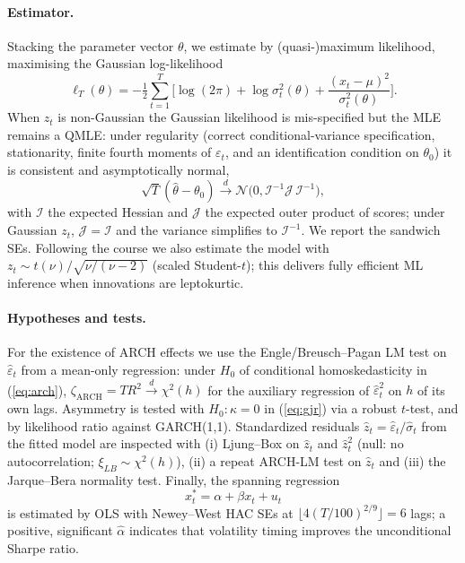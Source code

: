 \documentclass[12pt]{article}
\begin{document}
\paragraph{Estimator.} Stacking the parameter vector $\theta$, we estimate by (quasi-)maximum likelihood, maximising the Gaussian log-likelihood
\begin{equation}
\ell_T(\theta)=-\tfrac12\sum_{t=1}^{T}\Big[\log(2\pi)+\log\sigma_t^2(\theta)+\frac{(x_t-\mu)^2}{\sigma_t^2(\theta)}\Big].
\label{eq:loglik}
\end{equation}
When $z_t$ is non-Gaussian the Gaussian likelihood is mis-specified but the MLE remains a QMLE: under regularity (correct conditional-variance specification, stationarity, finite fourth moments of $\varepsilon_t$, and an identification condition on $\theta_0$) it is consistent and asymptotically normal,
\[
\sqrt{T}(\hat\theta-\theta_0)\xrightarrow{d}\mathcal{N}\big(0,\mathcal{I}^{-1}\mathcal{J}\,\mathcal{I}^{-1}\big),
\]
with $\mathcal{I}$ the expected Hessian and $\mathcal{J}$ the expected outer product of scores; under Gaussian $z_t$, $\mathcal{J}=\mathcal{I}$ and the variance simplifies to $\mathcal{I}^{-1}$. We report the sandwich SEs. Following the course we also estimate the model with $z_t\sim t(\nu)/\sqrt{\nu/(\nu-2)}$ (scaled Student-$t$); this delivers fully efficient ML inference when innovations are leptokurtic.

\paragraph{Hypotheses and tests.} For the existence of ARCH effects we use the Engle/Breusch--Pagan LM test on $\hat\varepsilon_t$ from a mean-only regression: under $H_0$ of conditional homoskedasticity in (\ref{eq:arch}), $\zeta_{\text{ARCH}}=TR^2\xrightarrow{d}\chi^2(h)$ for the auxiliary regression of $\hat\varepsilon_t^2$ on $h$ of its own lags. Asymmetry is tested with $H_0:\kappa=0$ in (\ref{eq:gjr}) via a robust $t$-test, and by likelihood ratio against GARCH(1,1). Standardized residuals $\hat z_t=\hat\varepsilon_t/\hat\sigma_t$ from the fitted model are inspected with (i) Ljung--Box on $\hat z_t$ and $\hat z_t^2$ (null: no autocorrelation; $\xi_{LB}\sim\chi^2(h)$), (ii) a repeat ARCH-LM test on $\hat z_t$ and (iii) the Jarque--Bera normality test. Finally, the spanning regression
\begin{equation}
x^*_t=\alpha+\beta x_t+u_t \label{eq:span}
\end{equation}
is estimated by OLS with Newey--West HAC SEs at $\lfloor 4(T/100)^{2/9}\rfloor=6$ lags; a positive, significant $\hat\alpha$ indicates that volatility timing improves the unconditional Sharpe ratio.
\end{document}
